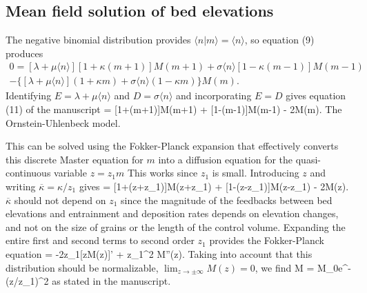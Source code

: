 \subsection{Mean field solution of bed elevations}

The negative binomial distribution provides $\langle n |m \rangle = \langle n \rangle$, so equation (9) produces 
\begin{multline} 0 = [\lambda + \mu \langle n \rangle][1+\kappa(m+1)]M(m+1) + \sigma \langle n \rangle [1-\kappa(m-1)]M(m-1) \\- \{[\lambda + \mu \langle n \rangle](1+\kappa m) + \sigma \langle n \rangle (1-\kappa m) \}M(m). \end{multline}
Identifying $E=\lambda + \mu \langle n \rangle$ and $D = \sigma \langle n \rangle$ and incorporating $E=D$ gives equation (11) of the manuscript
 = [1+\kappa(m+1)]M(m+1) + [1-\kappa(m-1)]M(m-1) - 2M(m).\ee
The \citet{Martin2014} Ornstein-Uhlenbeck model. 

This can be solved using the Fokker-Planck expansion \citep{Gardiner1983} that effectively converts this discrete Master equation for $m$ into a diffusion equation for the quasi-continuous variable $z=z_1 m$ This works since $z_1$ is small. Introducing $z$ and writing $\overline{\kappa}=\kappa/z_1$ gives
 = [1+\overline{\kappa}(z+z_1)]M(z+z_1) + [1-\overline{\kappa}(z-z_1)]M(z-z_1) - 2M(z).\ee
$\overline{\kappa}$ should not depend on $z_1$ since the magnitude of the feedbacks between bed elevations and entrainment and deposition rates depends on elevation changes, and not on the size of grains or the length of the control volume.
Expanding the entire first and second terms to second order $z_1$ provides the Fokker-Planck equation
 = -2\overline{\kappa}z_1[zM(z)]' + z_1^2 M''(z). \ee
Taking into account that this distribution should be normalizable, $\lim_{z\rightarrow \pm \infty}M(z) = 0$, we find
\be M = M_0e^{-\kappa (z/z_1)^2}\ee
as stated in the manuscript.


